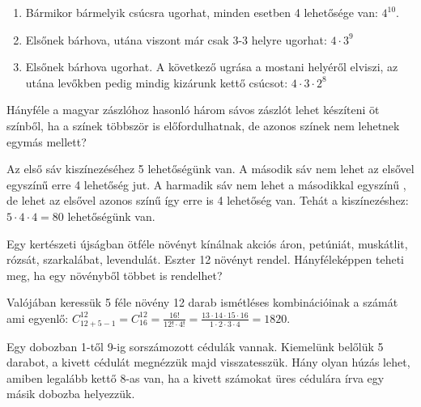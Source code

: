 \begin{solution}
\begin{enumerate}
\item  Bármikor bármelyik csúcsra ugorhat, minden esetben 4 lehetősége
van: $4^{10}.$
\item  Elsőnek bárhova, utána viszont már csak 3-3 helyre ugorhat: $4\cdot3^{9}$
\item Elsőnek bárhova ugorhat. A következő ugrása a mostani helyéről
elviszi, az utána levőkben pedig mindig kizárunk kettő csúcsot: $4\cdot3\cdot2^{8}$ 
\end{enumerate}

\end{solution}
\begin{problem}
Hányféle a magyar zászlóhoz hasonló három sávos zászlót lehet készíteni
öt színből, ha a színek többször is előfordulhatnak, de azonos színek
nem lehetnek egymás mellett?
\end{problem}

\begin{solution}
Az első sáv kiszínezéséhez 5 lehetőségünk van. A második sáv nem lehet
az elsővel egyszínű erre 4 lehetőség jut. A harmadik sáv nem lehet
a másodikkal egyszínű , de lehet az elsővel azonos színű így erre
is 4 lehetőség van. Tehát a kiszínezéshez: $5\cdot4\cdot4=80$ lehetőségünk
van.
\end{solution}
\begin{problem}
Egy kertészeti újságban ötféle növényt kínálnak akciós áron, petúniát,
muskátlit, rózsát, szarkalábat, levendulát. Eszter 12 növényt rendel.
Hányféleképpen teheti meg, ha egy növényből többet is rendelhet? 
\end{problem}

\begin{solution}
Valójában keressük 5 féle növény 12 darab ismétléses kombinációinak
a számát ami egyenlő: $C_{12+5-1}^{12}=C_{16}^{12}=\frac{16!}{12!\cdot4!}=\frac{13\cdot14\cdot15\cdot16}{1\cdot2\cdot3\cdot4}=1820.$
\end{solution}
\begin{problem}
Egy dobozban 1-től 9-ig sorszámozott cédulák vannak. Kiemelünk belőlük
5 darabot, a kivett cédulát megnézzük majd visszatesszük. Hány olyan
húzás lehet, amiben legalább kettő 8-as van, ha a kivett számokat
üres cédulára írva egy másik dobozba helyezzük. 
\end{problem}

